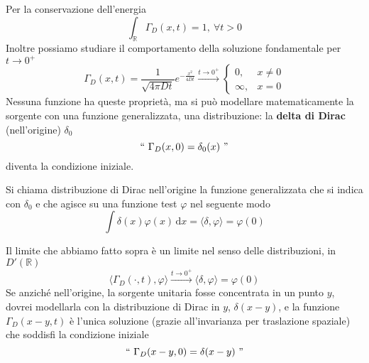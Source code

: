 \documentclass[10pt,a4paper,twoside,openright]{book}
\newcommand{\de}{\,\mathrm d}
\newcommand{\dx}{\de x}
\begin{document}
Per la conservazione dell'energia
\begin{equation*}
\int _{\mathbb{R}} \Gamma _{D}(x,t) =1,\ \forall t >0
\end{equation*}
Inoltre possiamo studiare il comportamento della soluzione fondamentale per $\displaystyle t\rightarrow 0^{+}$
\begin{equation*}
\Gamma _{D}(x,t) =\frac{1}{\sqrt{4\pi Dt}} e^{-\frac{x^{2}}{4Dt}}\xrightarrow{t\rightarrow 0^{+}}
\begin{cases}
0, & x\neq 0\\
\infty, & x=0
\end{cases}
\end{equation*}
Nessuna funzione ha queste proprietà, ma si può modellare matematicamente la sorgente con una funzione generalizzata, una distribuzione: la \textbf{delta di Dirac }(nell'origine) $\displaystyle \delta _{0}$
\begin{equation*}
``\ \Gamma _{D}(x,0) =\delta _{0}(x) \ "
\end{equation*}
diventa la condizione iniziale.
\begin{definition}
 Si chiama distribuzione di Dirac nell'origine la funzione generalizzata che si indica con $\displaystyle \delta _{0}$ e che agisce su una funzione test $\displaystyle \varphi $ nel seguente modo
\begin{equation*}
\int \delta (x) \varphi (x) \dx=\langle \delta,\varphi \rangle =\varphi (0)
\end{equation*}
\end{definition}
Il limite che abbiamo fatto sopra è un limite nel senso delle distribuzioni, in $\displaystyle D'(\mathbb{R})$
\begin{equation*}
\langle \Gamma _{D}(\cdotp,t),\varphi \rangle \xrightarrow{t\rightarrow 0^{+}} \langle \delta,\varphi \rangle =\varphi (0)
\end{equation*}
Se anziché nell'origine, la sorgente unitaria fosse concentrata in un punto $y$, dovrei modellarla con la distribuzione di Dirac in $y$, $\displaystyle \delta (x-y)$, e la funzione $\displaystyle \Gamma _{D}(x-y,t)$ è l'unica soluzione (grazie all'invarianza per traslazione spaziale) che soddisfi la condizione iniziale 
\begin{equation*}
``\ \Gamma _{D}(x-y,0) =\delta (x-y)\ "
\end{equation*}
\end{document}
